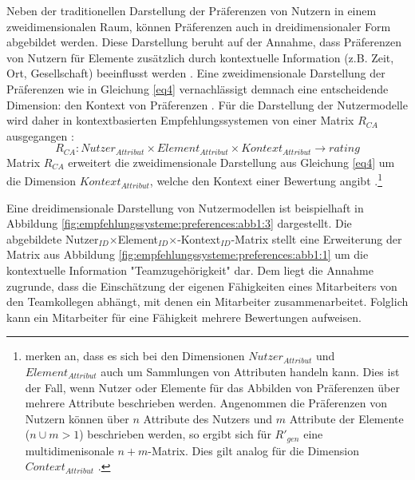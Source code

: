 Neben der traditionellen Darstellung der Präferenzen von Nutzern in einem zweidimensionalen Raum, können Präferenzen auch in dreidimensionaler Form abgebildet werden.
Diese Darstellung beruht auf der Annahme, dass Präferenzen von Nutzern für Elemente zusätzlich durch kontextuelle Information (z.B. Zeit, Ort, Gesellschaft) beeinflusst werden \cite[S. 195]{adomavicius:3:inbook}.
Eine zweidimensionale Darstellung der Präferenzen wie in Gleichung \ref{eq4} vernachlässigt demnach eine entscheidende Dimension: den Kontext von Präferenzen \cite[S. 253]{berkovsky:article}.
Für die Darstellung der Nutzermodelle wird daher in kontextbasierten Empfehlungssystemen von einer Matrix $R_{CA}$ ausgegangen \cite[S. 254]{berkovsky:article}:
\begin{equation}\label{eq9}
    R_{CA}: Nutzer_{Attribut} \times Element_{Attribut} \times Kontext_{Attribut} \rightarrow rating
\end{equation}
Matrix $R_{CA}$ erweitert die zweidimensionale Darstellung aus Gleichung \ref{eq4} um die Dimension $Kontext_{Attribut}$, welche den Kontext einer Bewertung angibt \cite[S. 254]{berkovsky:article}.\footnote{\textcite[S. 249ff.]{berkovsky:article} merken an, dass es sich bei den Dimensionen $Nutzer_{Attribut}$ und $Element_{Attribut}$ auch um Sammlungen von Attributen handeln kann. Dies ist der Fall, wenn Nutzer oder Elemente für das Abbilden von Präferenzen über mehrere Attribute beschrieben werden. Angenommen die Präferenzen von Nutzern können über $n$ Attribute des Nutzers und $m$ Attribute der Elemente ($n \cup m > 1$) beschrieben werden, so ergibt sich für $R'_{gen}$ eine multidimenisonale $n+m$-Matrix. Dies gilt analog für die Dimension $Context_{Attribut}$ \cite[S. 254f.]{berkovsky:article}.}

Eine dreidimensionale Darstellung von Nutzermodellen ist beispielhaft in Abbildung \ref{fig:empfehlungssysteme:preferences:abb1:3} dargestellt.
Die abgebildete Nutzer$_{ID}$$\times$Element$_{ID}$$\times$-Kontext$_{ID}$-Matrix stellt eine Erweiterung der Matrix aus Abbildung \ref{fig:empfehlungssysteme:preferences:abb1:1} um die kontextuelle Information "Teamzugehörigkeit" dar.
Dem liegt die Annahme zugrunde, dass die Einschätzung der eigenen Fähigkeiten eines Mitarbeiters von den Teamkollegen abhängt, mit denen ein Mitarbeiter zusammenarbeitet.
Folglich kann ein Mitarbeiter für eine Fähigkeit mehrere Bewertungen aufweisen.

